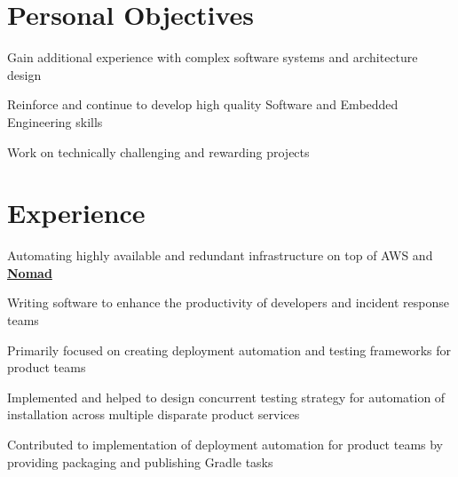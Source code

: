 \documentclass[letterpaper]{deedy-resume} %
\begin{document}
%
\begin{minipage}[t]{0.66\textwidth} %


\section{Personal Objectives}
\vspace{\topsep} %
\begin{tightitemize}
\item Gain additional experience with complex software systems and architecture design
\item Reinforce and continue to develop high quality Software and Embedded Engineering skills
\item Work on technically challenging and rewarding projects
\end{tightitemize}


\section{Experience}


\begin{tightitemize}
\item Automating highly available and redundant infrastructure on top of AWS and \href{https://www.nomadproject.io}{\bf Nomad}
\item Writing software to enhance the productivity of developers and incident response teams
\end{tightitemize}

\sectionspace %

\begin{tightitemize}
\item Primarily focused on creating deployment automation and testing frameworks for product teams
\item Implemented and helped to design concurrent testing strategy for automation of installation across multiple disparate product services
\item Contributed to implementation of deployment automation for product teams by providing packaging and publishing Gradle tasks
\end{tightitemize}


\end{minipage}
\end{document}
